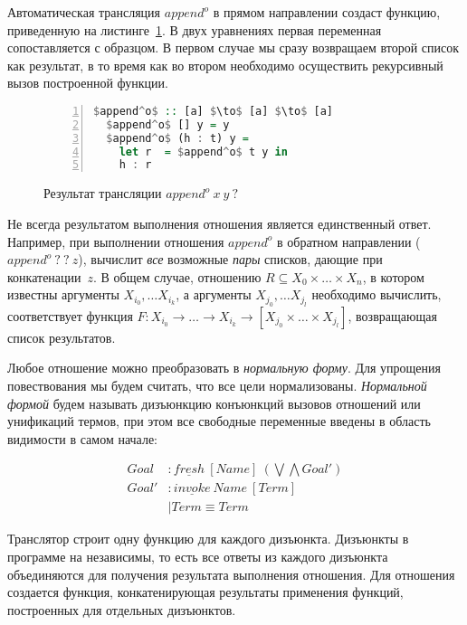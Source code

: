 \documentclass[conference,american,russian]{IEEEtran}
\begin{document}
Автоматическая трансляция $append^o$ в прямом направлении создаст функцию, приведенную на листинге~\ref{lst:appendoFWD}. 
В двух уравнениях первая переменная сопоставляется с образцом. 
В первом случае мы сразу возвращаем второй список как результат, в то время как во втором необходимо осуществить рекурсивный вызов построенной функции. 

\begin{figure}[h!]
  \begin{center}
  \begin{minipage}{0.35\textwidth}
  \begin{lstlisting}[language=Haskell, frame=single, numbers=left,numberstyle=\small, escapechar=|]
  $append^o$ :: [a] $\to$ [a] $\to$ [a]
  $append^o$ [] y = y
  $append^o$ (h : t) y =
    let r  = $append^o$ t y in 
    h : r 
  \end{lstlisting}
  \end{minipage}
  \end{center}
  \caption{Результат трансляции $append^o \ x \ y \ ?$}
  \label{lst:appendoFWD}
\end{figure}

Не всегда результатом выполнения отношения является единственный ответ.
Например, при выполнении отношения $append^o$ в обратном направлении ($append^o \ ? \ ? \ z$), \miniKanren{} вычислит \emph{все} возможные \emph{пары} списков, дающие при конкатенации~$z$. 
В общем случае, отношению $R \subseteq X_0 \times \dots \times X_n$, в котором известны аргументы $X_{i_0}, \dots X_{i_k}$, а аргументы $X_{j_0}, \dots X_{j_l}$ необходимо вычислить, соответствует функция $F : X_{i_0} \to \dots \to X_{i_k} \to [X_{j_0} \times \dots \times X_{j_l}]$, возвращающая список результатов. 

Любое отношение можно преобразовать в \emph{нормальную форму}. 
Для упрощения повествования мы будем считать, что все цели нормализованы. 
\emph{Нормальной формой} будем называть дизъюнкцию конъюнкций вызовов отношений или унификаций термов, при этом все свободные переменные введены в область видимости в самом начале:

\begin{align*}
  Goal  &: \underline{fresh} \ [Name] \ (\bigvee \bigwedge Goal') \\
  Goal' &: \underline{invoke} \ Name \ [Term] \\
        &\mid Term \equiv Term 
\end{align*}

Транслятор строит одну функцию для каждого дизъюнкта. 
Дизъюнкты в программе на \miniKanren{} независимы, то есть все ответы из каждого дизъюнкта объединяются для получения результата выполнения отношения. 
Для отношения создается функция, конкатенирующая результаты применения функций, построенных для отдельных дизъюнктов. 
\end{document}
